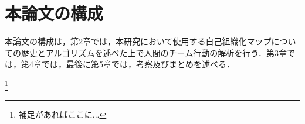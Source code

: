 \section{本論文の構成}%
本論文の構成は，第2章では，本研究において使用する自己組織化マップについての歴史とアルゴリズムを述べた上で人間のチーム行動の解析を行う．第3章では，第4章では，最後に第5章では，考察及びまとめを述べる．



  \footnote{
補足があればここに...
} %











